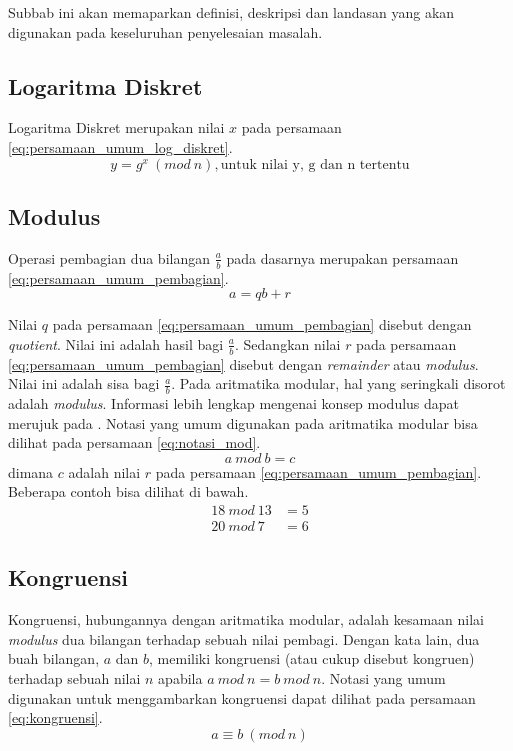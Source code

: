Subbab ini akan memaparkan definisi, deskripsi dan landasan yang akan digunakan pada keseluruhan penyelesaian masalah.

\subsection{Logaritma Diskret}
Logaritma Diskret merupakan nilai $ x $ pada persamaan \eqref{eq:persamaan_umum_log_diskret}.
\begin{equation}
y = g^{x}\ (mod\ n),\text{untuk nilai y, g dan n tertentu}
\label{eq:persamaan_umum_log_diskret}
\end{equation}

\subsection{Modulus}
Operasi pembagian dua bilangan $\frac{a}{b}$ pada dasarnya merupakan persamaan \eqref{eq:persamaan_umum_pembagian}.
\begin{equation}
a=qb+r
\label{eq:persamaan_umum_pembagian}
\end{equation}

Nilai $q$ pada persamaan \eqref{eq:persamaan_umum_pembagian} disebut dengan \textit{quotient}. Nilai ini adalah hasil bagi $\frac{a}{b}$. Sedangkan nilai $r$ pada persamaan \eqref{eq:persamaan_umum_pembagian} disebut dengan \textit{remainder} atau \textit{modulus}. Nilai ini adalah sisa bagi $\frac{a}{b}$. Pada aritmatika modular, hal yang seringkali disorot adalah \textit{modulus}. Informasi lebih lengkap mengenai konsep modulus dapat merujuk pada \cite{stallings_cryptography}. Notasi yang umum digunakan pada aritmatika modular bisa dilihat pada persamaan \eqref{eq:notasi_mod}.
\begin{equation}
a\ mod\ b=c
\label{eq:notasi_mod}
\end{equation}
dimana $c$ adalah nilai $r$ pada persamaan \eqref{eq:persamaan_umum_pembagian}. Beberapa contoh bisa dilihat di bawah.
\begin{align*}
18\ mod\ 13 & = 5 \\
20\ mod\ 7 & = 6
\end{align*}

\subsection{Kongruensi}
Kongruensi, hubungannya dengan aritmatika modular, adalah kesamaan nilai \textit{modulus} dua bilangan terhadap sebuah nilai pembagi. Dengan kata lain, dua buah bilangan, $a$ dan $b$, memiliki kongruensi (atau cukup disebut kongruen) terhadap sebuah nilai $n$ apabila $a\ mod\ n=b\ mod\ n$. Notasi yang umum digunakan untuk menggambarkan kongruensi dapat dilihat pada persamaan \eqref{eq:kongruensi}.
\begin{equation}
a\equiv b\ (mod\ n)
\label{eq:kongruensi}
\end{equation}

